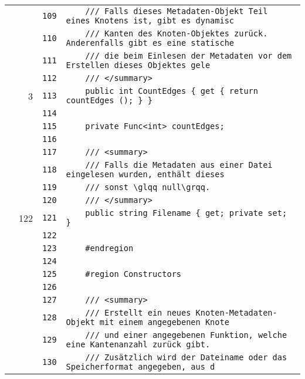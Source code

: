 \documentclass[a4paper,10pt]{article}
\begin{document}
\begin{longtable}[l]{lrrl}
\cellcolor{gray} &  & \verb~109~ & \verb~    /// Falls dieses Metadaten-Objekt Teil eines Knotens ist, gibt es dynamisc~\\
\cellcolor{gray} &  & \verb~110~ & \verb~    /// Kanten des Knoten-Objektes zurück. Anderenfalls gibt es eine statische~\\
\cellcolor{gray} &  & \verb~111~ & \verb~    /// die beim Einlesen der Metadaten vor dem Erstellen dieses Objektes gele~\\
\cellcolor{gray} &  & \verb~112~ & \verb~    /// </summary>~\\
\cellcolor{green} & 3 & \verb~113~ & \verb~    public int CountEdges { get { return countEdges (); } }~\\
\cellcolor{gray} &  & \verb~114~ & \verb~~\\
\cellcolor{gray} &  & \verb~115~ & \verb~    private Func<int> countEdges;~\\
\cellcolor{gray} &  & \verb~116~ & \verb~~\\
\cellcolor{gray} &  & \verb~117~ & \verb~    /// <summary>~\\
\cellcolor{gray} &  & \verb~118~ & \verb~    /// Falls die Metadaten aus einer Datei eingelesen wurden, enthält dieses ~\\
\cellcolor{gray} &  & \verb~119~ & \verb~    /// sonst \glqq null\grqq.~\\
\cellcolor{gray} &  & \verb~120~ & \verb~    /// </summary>~\\
\cellcolor{green} & 122 & \verb~121~ & \verb~    public string Filename { get; private set; }~\\
\cellcolor{gray} &  & \verb~122~ & \verb~~\\
\cellcolor{gray} &  & \verb~123~ & \verb~    #endregion~\\
\cellcolor{gray} &  & \verb~124~ & \verb~~\\
\cellcolor{gray} &  & \verb~125~ & \verb~    #region Constructors~\\
\cellcolor{gray} &  & \verb~126~ & \verb~~\\
\cellcolor{gray} &  & \verb~127~ & \verb~    /// <summary>~\\
\cellcolor{gray} &  & \verb~128~ & \verb~    /// Erstellt ein neues Knoten-Metadaten-Objekt mit einem angegebenen Knote~\\
\cellcolor{gray} &  & \verb~129~ & \verb~    /// und einer angegebenen Funktion, welche eine Kantenanzahl zurück gibt.~\\
\cellcolor{gray} &  & \verb~130~ & \verb~    /// Zusätzlich wird der Dateiname oder das Speicherformat angegeben, aus d~\\

\end{longtable}
\end{document}
